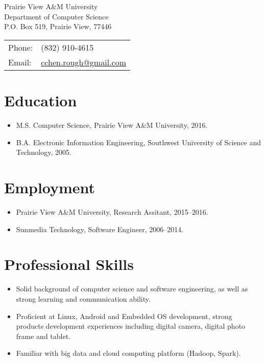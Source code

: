 \section*{\large \bf \name}
\begin{singlespace}

\begin{minipage}{0.45\linewidth}
  Prairie View A\&M University \\
  Department of Computer Science \\
  P.O. Box 519, Prairie View, 77446
\end{minipage}
\begin{minipage}{0.45\linewidth}
  \begin{tabular}{ll}
    Phone: & (832) 910-4615 \\
    Email: & \url{cchen.rough@gmail.com} \\
  \end{tabular}
\end{minipage}


\section*{\large \bf Education}

\begin{itemize}
  \item M.S. Computer Science, Prairie View A\&M University, 2016.

  \item B.A. Electronic Information Engineering, Southwest University of Science and Technology, 2005.

\end{itemize}

\section*{\large \bf Employment}

\begin{itemize}
\item Prairie View A\&M University, Research Assitant, 2015--2016.
\item Sunmedia Technology, Software Engineer, 2006--2014.
\end{itemize}


\section*{\large \bf Professional Skills}
\begin{itemize}
\item Solid background of computer science and software engineering, as well as strong learning and communication ability.
\item Proficient at Linux, Android and Embedded OS development, strong products development experiences including digital camera, digital photo frame and tablet.
\item Familiar with big data and cloud computing platform (Hadoop, Spark).
\end{itemize}




\end{singlespace}
